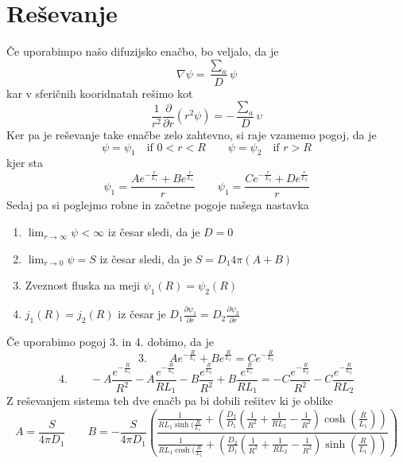 \documentclass[slovene,11pt,a4paper]{article}
\begin{document}
\section{Reševanje}
Če uporabimpo našo difuzijsko enačbo, bo veljalo, da je 
\begin{equation}
    \nabla \psi=\frac{\sum_a}{D}\psi
\end{equation}
kar v sferičnih kooridnatah rešimo kot 
\begin{equation}
     \frac{1}{r^2}\frac{\partial}{\partial r}\left(r^2\psi\right)=-\frac{\sum_a}{D}\upsilon
\end{equation}
Ker pa je reševanje take enačbe zelo zahtevno, si raje vzamemo pogoj, da je 
\begin{equation}
    \psi=\psi_1 \quad \text{if } 0<r<R \qquad \psi=\psi_2 \quad \text{if } r>R
\end{equation}
kjer sta
\begin{equation}
    \psi_1=\frac{Ae^{-\frac{r}{L_1}}+Be^{\frac{r}{L_1}}}{r} \qquad \psi_1=\frac{Ce^{-\frac{r}{L_2}}+De^{\frac{r}{L_2}}}{r}
\end{equation}
Sedaj pa si poglejmo robne in začetne pogoje našega nastavka
\begin{enumerate}
    \item $\lim_{r \rightarrow \infty} \psi < \infty$ iz česar sledi, da je $D=0$ \\
    \item $\lim_{r \rightarrow 0} \psi =S$ iz česar sledi, da je $S=D_1 4\pi(A+B)$ \\
    \item Zveznost fluska na meji $\psi_1(R)=\psi_2(R)$ \\
    \item $j_1(R)=j_2(R)$ iz česar je $D_1\frac{\partial \psi_1}{\partial r}=D_2\frac{\partial \psi_2}{\partial r}$
\end{enumerate}
Če uporabimo pogoj 3. in 4. dobimo, da je 
\begin{equation}
    \text{3.}\qquad Ae^{-\frac{R}{L_1}}+Be^{\frac{R}{L_1}}=Ce^{-\frac{R}{L_2}} 
\end{equation}
\begin{equation}
    \text{4.}\qquad -A\frac{e^{-\frac{R}{L_1}}}{R^2}-A\frac{e^{-\frac{R}{L_1}}}{RL_1}-B\frac{e^{\frac{R}{L_2}}}{R^2}+B\frac{e^{\frac{R}{L_1}}}{RL_1}=-C\frac{e^{-\frac{R}{L_2}}}{R^2}-C\frac{e^{-\frac{R}{L_2}}}{RL_2}
\end{equation}
Z reševanjem sistema teh dve enačb pa bi dobili rešitev ki je oblike
\begin{equation}
    A=\frac{S}{4\pi D_1} \qquad B=-\frac{S}{4\pi D_1}\left(\frac{\frac{1}{RL_1\sinh(\frac{R}{L_1}}+\left(\frac{D_2}{D_1}\left(\frac{1}{R^2}+\frac{1}{RL_2}-\frac{1}{R^2}\right)\cosh\left(\frac{R}{L_1}\right)\right)}{\frac{1}{RL_1\cosh(\frac{R}{L_1}}+\left(\frac{D_2}{D_1}\left(\frac{1}{R^2}+\frac{1}{RL_2}-\frac{1}{R^2}\right)\sinh\left(\frac{R}{L_1}\right)\right)}\right)
\end{equation}
\end{document}
